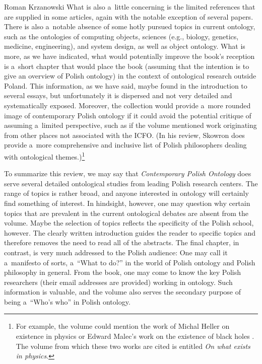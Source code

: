 \begin{recengenv}{Roman Krzanowski}
What is also a~little concerning is the limited references that are supplied in some articles, again with the notable exception of several papers. There is also a~notable absence of some hotly pursued topics in current ontology, such as the ontologies of computing objects, sciences (e.g., biology, genetics, medicine, engineering), and system design, as well as object ontology. What is more, as we have indicated, what would potentially improve the book's reception is a~short chapter that would place the book (assuming that the intention is to give an overview of Polish ontology) in the context of ontological research outside Poland. This information, as we have said, maybe found in the introduction to several essays, but unfortunately it is dispersed and not very detailed and systematically exposed. Moreover, the collection would provide a~more rounded image of %
contemporary Polish ontology if it could avoid the potential critique of assuming a~limited perspective, such as if the volume mentioned work originating from other places not associated with the ICFO. (In his review, Skowron does provide a~more comprehensive and inclusive list of Polish philosophers dealing with ontological themes.)\footnote{For example, the volume could mention the work of Michal Heller on existence in physics
\parencite[][]{heller_what_2018} %
 or Edward Malec's work on the existence of black holes 
\parencite[][]{malec_black_2018}. %
 The volume from which these two works are cited is entitled \textit{On what exists in physics}.}

\enlargethispage{-.5\baselineskip}
To summarize this review, we may say that \textit{Contemporary Polish Ontology} does serve several detailed ontological studies from leading Polish research centers. The range of topics is rather broad, and anyone interested in ontology will certainly find something of interest. In hindsight, however, one may question why certain topics that are prevalent in the current ontological debates are absent from the volume. Maybe the selection of topics reflects the specificity of the Polish school, however. The clearly written introduction guides the reader to specific topics and therefore removes the need to read all of the abstracts. The final chapter, in contrast, is very much addressed to the Polish audience: One may call it a~manifesto of sorts, a~“What to do?'' in the world of Polish ontology and Polish philosophy in general. From the book, one may come to know the key Polish researchers (their email addresses are provided) working in ontology. Such information is valuable, and the volume also serves the secondary purpose of being a~“Who's who'' in Polish ontology.



\end{recengenv}